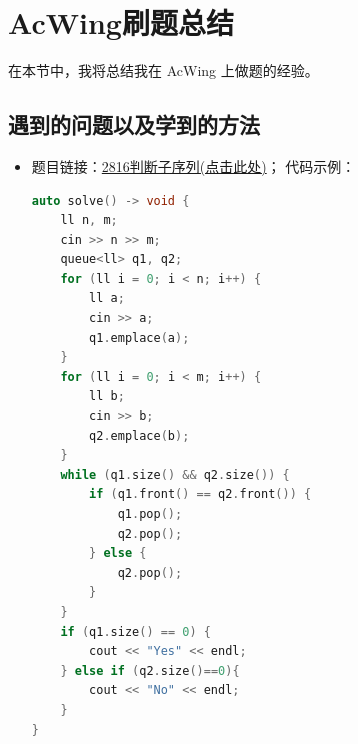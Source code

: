 \section{AcWing刷题总结}
在本节中，我将总结我在 AcWing 上做题的经验。

\subsection{遇到的问题以及学到的方法}
\begin{itemize}
\subsection{2816判断子序列}
\item 题目链接：\href{https://www.acwing.com/problem/content/2818/}{2816判断子序列(点击此处)}；
代码示例：\\
\begin{lstlisting}[language=C++]
auto solve() -> void {
	ll n, m;
	cin >> n >> m;
	queue<ll> q1, q2;
	for (ll i = 0; i < n; i++) {
		ll a;
		cin >> a;
		q1.emplace(a);
	}
	for (ll i = 0; i < m; i++) {
		ll b;
		cin >> b;
		q2.emplace(b);
	}
	while (q1.size() && q2.size()) {
		if (q1.front() == q2.front()) {
			q1.pop();
			q2.pop();
		} else {
			q2.pop();
		}
	}
	if (q1.size() == 0) {
		cout << "Yes" << endl;
	} else if (q2.size()==0){
		cout << "No" << endl;
	}
}
\end{lstlisting}
\end{itemize}
\newpage